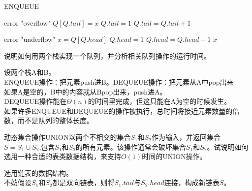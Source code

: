 \documentclass[a4paper, justified]{tufte-handout}
\begin{document}
\begin{solution}
  \begin{algorithm}[H]
    \caption{ENQUEUE}
    \label{alg:sum}
    \begin{algorithmic}[1]
      \State error "overflow"
      \Else
      \State $Q[Q.tail] = x$
      \State $Q.tail = 1$
      \Else \State $Q.tail = Q.tail + 1$
      \EndIf
      \EndIf
      \EndProcedure
    \end{algorithmic}
  \end{algorithm}
  \begin{algorithm}
    \begin{algorithmic}[2]
      \State error "underflow"
      \Else
      \State $x = Q[Q.head]$
      \State $Q.head = 1$
      \Else \State $Q.head = Q.head + 1$
      \EndIf
      \State \Return $x$
      \EndIf
      \EndProcedure
    \end{algorithmic}
  \end{algorithm}

\end{solution}

\begin{problem}[TC 10.1-6]
说明如何用两个栈实现一个队列，并分析相关队列操作的运行时间。
\end{problem}

\begin{solution}
  设两个栈A和B。\\
  ENQUEUE操作：把元素push进B。DEQUEUE操作：把元素从A中pop出来\\
  如果A是空的，B中的内容就从Bpop出来，push进A。\\
  DEQUEUE操作能在$\Theta (n)$的时间里完成，但这只能在A为空的时候发生。\\
  如果许多ENQUEUE和DEQUEUE的操作被执行，总时间将接近元素数量的倍数，而不是队列的整体长度。
\end{solution}

\begin{problem}[TC 10.2-6]
动态集合操作UNION以两个不相交的集合$S_1$和$S_2$作为输入，并返回集合$S = S_1 \cup S_2$,包含$S_1$和$S_2$的所有元素。该操作通常会破坏集合$S_1$和$S_2$。试说明如何选用一种合适的表类数据结构，来支持$O(1)$时间的UNION操作。
\end{problem}

\begin{solution}
  选用链表的数据结构。\\
  不妨假设$S_1$和$S_2$都是双向链表，则将$S_1.tail$与$S_2.head$连接，构成新链表$S$。
\end{solution}
\end{document}
